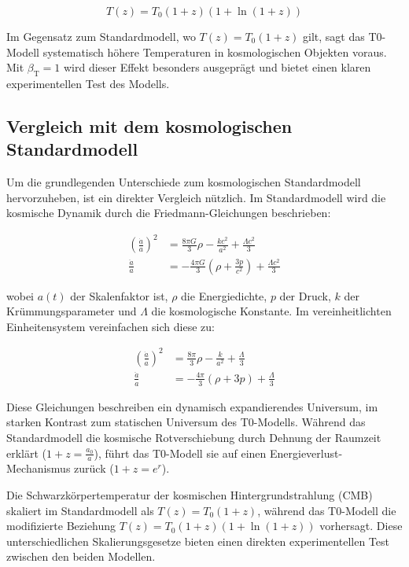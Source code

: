 \documentclass[12pt,a4paper]{article}
\newcommand{\betaT}{\beta_{\text{T}}}
\begin{document}
	\begin{equation}
		T(z) = T_0 (1+z)(1 + \ln(1+z))
	\end{equation}
	
	Im Gegensatz zum Standardmodell, wo \(T(z) = T_0 (1+z)\) gilt, sagt das T0-Modell systematisch höhere Temperaturen in kosmologischen Objekten voraus. Mit \(\betaT = 1\) wird dieser Effekt besonders ausgeprägt und bietet einen klaren experimentellen Test des Modells.
	
	\subsection{Vergleich mit dem kosmologischen Standardmodell}
	Um die grundlegenden Unterschiede zum kosmologischen Standardmodell hervorzuheben, ist ein direkter Vergleich nützlich. Im Standardmodell wird die kosmische Dynamik durch die Friedmann-Gleichungen beschrieben:
	
	\begin{align}
		\left(\frac{\dot{a}}{a}\right)^2 &= \frac{8\pi G}{3}\rho - \frac{kc^2}{a^2} + \frac{\Lambda c^2}{3} \\
		\frac{\ddot{a}}{a} &= -\frac{4\pi G}{3}\left(\rho + \frac{3p}{c^2}\right) + \frac{\Lambda c^2}{3}
	\end{align}
	
	wobei \(a(t)\) der Skalenfaktor ist, \(\rho\) die Energiedichte, \(p\) der Druck, \(k\) der Krümmungsparameter und \(\Lambda\) die kosmologische Konstante. Im vereinheitlichten Einheitensystem vereinfachen sich diese zu:
	
	\begin{align}
		\left(\frac{\dot{a}}{a}\right)^2 &= \frac{8\pi}{3}\rho - \frac{k}{a^2} + \frac{\Lambda}{3} \\
		\frac{\ddot{a}}{a} &= -\frac{4\pi}{3}(\rho + 3p) + \frac{\Lambda}{3}
	\end{align}
	
	Diese Gleichungen beschreiben ein dynamisch expandierendes Universum, im starken Kontrast zum statischen Universum des T0-Modells. Während das Standardmodell die kosmische Rotverschiebung durch Dehnung der Raumzeit erklärt (\(1+z = \frac{a_0}{a}\)), führt das T0-Modell sie auf einen Energieverlust-Mechanismus zurück (\(1+z = e^r\)).
	
	Die Schwarzkörpertemperatur der kosmischen Hintergrundstrahlung (CMB) skaliert im Standardmodell als \(T(z) = T_0(1+z)\), während das T0-Modell die modifizierte Beziehung \(T(z) = T_0(1+z)(1+\ln(1+z))\) vorhersagt. Diese unterschiedlichen Skalierungsgesetze bieten einen direkten experimentellen Test zwischen den beiden Modellen.
	
\end{document}
